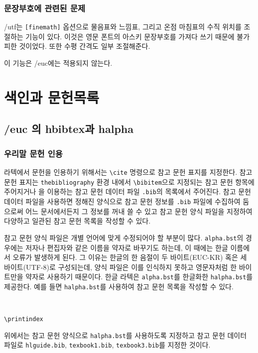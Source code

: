 \subsection{문장부호에 관련된 문제}

\kotex/utf는 \texttt{[finemath]} 옵션으로 
물음표와 느낌표, 그리고 온점 마침표의 수직 위치를 조절하는
기능이 있다. 이것은 영문 폰트의 아스키 문장부호를 가져다 쓰기 때문에
불가피한 것이었다. 또한 수평 간격도 일부 조절해준다. 

이 기능은 \kotex/euc에는 적용되지 않는다. 

\chapter{색인과 문헌목록}

\section{\kotex/euc 의 hbibtex과 halpha}

\subsection{우리말 문헌 인용}
\label{sec:cite}

라텍에서 문헌을 인용하기 위해서는 \texttt{\textbackslash{}cite}
명령으로 참고 문헌 표지를 지정한다.  참고 문헌 표지는
\texttt{thebibliography} 환경 내에서
\texttt{\textbackslash{}bibitem}으로 지정되는 참고 문헌 항목에
주어지거나 \BibTeX{}을 이용하는 참고 문헌 데이터 파일 \texttt{.bib}의
목록에서 주어진다.  참고 문헌 데이터 파일을 사용하면 정해진 양식으로
참고 문헌 정보를 \texttt{.bib} 파일에 수집하여 둠으로써 어느
문서에서든지 그 정보를 꺼내 쓸 수 있고 참고 문헌 양식 파일을 지정하여
다양하고 일관된 참고 문헌 목록을 작성할 수 있다.

참고 문헌 양식 파일은 개별 언어에 맞게 수정되어야 할 부분이 많다.
\texttt{alpha.bst}의 경우에는 저자나 편집자와 같은 이름을 약자로
바꾸기도 하는데, 이 때에는 한글 이름에서 오류가 발생하게 된다.  그
이유는 한글의 한 음절이 두 바이트(EUC-KR) 혹은 세 바이트(UTF-8)로
구성되는데, 양식 파일은 이를 인식하지 못하고 영문자처럼 한 바이트만을
약자로 사용하기 때문이다.  한글 라텍은 \texttt{alpha.bst}를 한글화한
\texttt{halpha.bst}를 제공한다.  예를 들면 
\texttt{halpha.bst}를 사용하여 참고 문헌 목록을 작성할 수 있다.
\begin{verbatim}


\printindex
\end{verbatim}
위에서는 참고 문헌 양식으로 \texttt{halpha.bst}를 사용하도록 지정하고
참고 문헌 데이터 파일로 \texttt{hlguide.bib}, \texttt{texbook1.bib},
\texttt{texbook3.bib}를 지정한 것이다.

